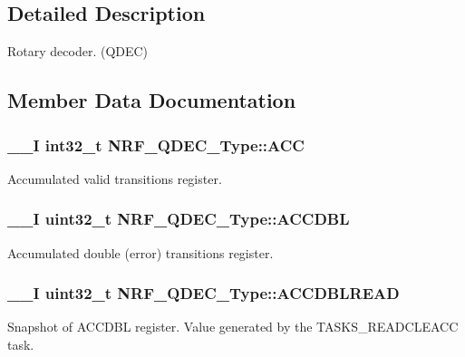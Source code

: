 \subsection{Detailed Description}
Rotary decoder. (Q\+D\+E\+C) 

\subsection{Member Data Documentation}
\hypertarget{struct_n_r_f___q_d_e_c___type_a78514dfafa9095d432eb94de37b438d4}{}
\subsubsection[{A\+C\+C}]{\setlength{\rightskip}{0pt plus 5cm}\+\_\+\+\_\+\+I int32\+\_\+t N\+R\+F\+\_\+\+Q\+D\+E\+C\+\_\+\+Type\+::\+A\+C\+C}\label{struct_n_r_f___q_d_e_c___type_a78514dfafa9095d432eb94de37b438d4}
Accumulated valid transitions register. \hypertarget{struct_n_r_f___q_d_e_c___type_ac467aea23e34220e3faf3ae839c6b401}{}
\subsubsection[{A\+C\+C\+D\+B\+L}]{\setlength{\rightskip}{0pt plus 5cm}\+\_\+\+\_\+\+I uint32\+\_\+t N\+R\+F\+\_\+\+Q\+D\+E\+C\+\_\+\+Type\+::\+A\+C\+C\+D\+B\+L}\label{struct_n_r_f___q_d_e_c___type_ac467aea23e34220e3faf3ae839c6b401}
Accumulated double (error) transitions register. \hypertarget{struct_n_r_f___q_d_e_c___type_a0d3b1f64fe6d77d58ffc0914ae2fa493}{}
\subsubsection[{A\+C\+C\+D\+B\+L\+R\+E\+A\+D}]{\setlength{\rightskip}{0pt plus 5cm}\+\_\+\+\_\+\+I uint32\+\_\+t N\+R\+F\+\_\+\+Q\+D\+E\+C\+\_\+\+Type\+::\+A\+C\+C\+D\+B\+L\+R\+E\+A\+D}\label{struct_n_r_f___q_d_e_c___type_a0d3b1f64fe6d77d58ffc0914ae2fa493}
Snapshot of A\+C\+C\+D\+B\+L register. Value generated by the T\+A\+S\+K\+S\+\_\+\+R\+E\+A\+D\+C\+L\+E\+A\+C\+C task. \hypertarget{struct_n_r_f___q_d_e_c___type_ab55aa1e5dac65c12b15ae9ce608d40eb}{}
